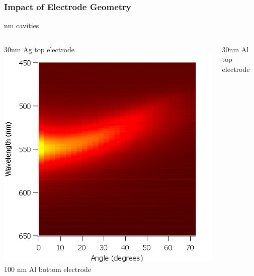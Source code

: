 \documentclass{beamer}
\begin{document}
\begin{frame}
\begin{columns}
\begin{column}{0.6\textwidth}
                \end{column}
            \end{columns}
        \end{frame}
        
        \begin{frame}
            \frametitle{Impact of Electrode Geometry}
             nm cavities
			\vspace{0.5cm}
            \begin{columns}
				\begin{column}{0.5\textwidth}
					\centering
					30nm Ag top electrode
					\includegraphics[width=\textwidth]{images/n1_ag_top_heatmap.png}
					100 nm Al bottom electrode
				\end{column}
				\begin{column}{0.5\textwidth}
					\centering
					30nm Al top electrode

\end{column}
\end{columns}
\end{frame}
\end{document}
